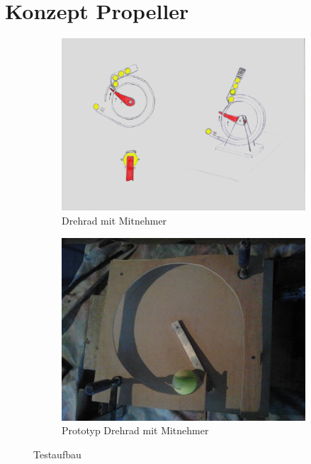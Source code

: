 \section{Konzept Propeller}

\begin{figure}[h!]
	\centering
	\begin{subfigure}[b]{0.45\textwidth}
		\includegraphics[width=\textwidth]{../../fig/Drehrad_Mitnehmer.jpg}
		\caption{Drehrad mit Mitnehmer}
	\end{subfigure}
	\begin{subfigure}[b]{0.45\textwidth}
		\includegraphics[width=\textwidth]{../../fig/prototyp_propeller.jpg}
		\caption{Prototyp Drehrad mit Mitnehmer}
	\end{subfigure}
	\caption{Testaufbau}
	\label{fig:drehrad_mitnehmer}
\end{figure}

